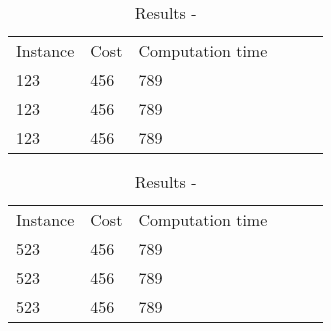 \documentclass[crop=false]{standalone}
\begin{document}
\begin{table}[]
	\begin{tabular}{llllll}
		Instance & Cost & Computation time \\ \cline{1-3}
		123 & 456 & 789 \\
		123 & 456 & 789 \\
		123 & 456 & 789 \\
	\end{tabular}
	\caption{Results - }
	\label{table:results_1}
\end{table}

\begin{table}[]
	\begin{tabular}{llllll}
		Instance & Cost & Computation time \\ \cline{1-3}
		523 & 456 & 789 \\
		523 & 456 & 789 \\
		523 & 456 & 789 \\
	\end{tabular}
	\caption{Results - }
	\label{table:results_2}
\end{table}
\end{document}

